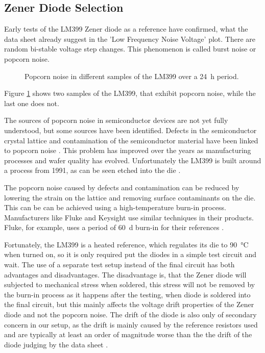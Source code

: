 \subsection{Zener Diode Selection}
\label{sec:zener_diode_selection}
Early tests of the LM399 Zener diode as a reference have confirmed, what the data sheet \cite{datasheet_LM399} already suggest in the 'Low Frequency Noise Voltage' plot. There are random bi-stable voltage step changes. This phenomenon is called burst noise or popcorn noise.

\begin{figure}[ht]
    \centering
    
    \caption{Popcorn noise in different samples of the LM399 over a \qty{24}{\hour} period.}
    \label{fig:popcorn_noise_lm399}
\end{figure}

Figure \ref{fig:popcorn_noise_lm399} shows two samples of the LM399, that exhibit popcorn noise, while the last one does not.

The sources of popcorn noise in semiconductor devices are not yet fully understood, but some sources have been identified. Defects in the semiconductor crystal lattice and contamination of the semiconductor material have been linked to popcorn noise \cite{technote_ti_popcorn_noise}. This problem has improved over the years as manufacturing processes and wafer quality has evolved. Unfortunately the LM399 is built around a process from 1991, as can be seen etched into the die \cite{lm399_richi}.

The popcorn noise caused by defects and contamination can be reduced by lowering the strain on the lattice and removing surface contaminants on the die. This can be can be achieved using a high-temperature burn-in process. Manufacturers like Fluke and Keysight use similar techniques in their products. Fluke, for example, uses a period of \qty{60}{\day} burn-in for their references \cite{zener_popcorn_noise}.

Fortunately, the LM399 is a heated reference, which regulates its die to \qty{90}{\celsius} when turned on, so it is only required put the diodes in a simple test circuit and wait. The use of a separate test setup instead of the final circuit has both advantages and disadvantages. The disadvantage is, that the Zener diode will subjected to mechanical stress when soldered, this stress will not be removed by the burn-in process as it happens after the testing, when diode is soldered into the final circuit, but this mainly affects the voltage drift properties of the Zener diode and not the popcorn noise. The drift of the diode is also only of secondary concern in our setup, as the drift is mainly caused by the reference resistors used and are typically at least an order of magnitude worse than the the drift of the diode judging by the data sheet \cite{datasheet_LM399,datasheet_VPR}.

